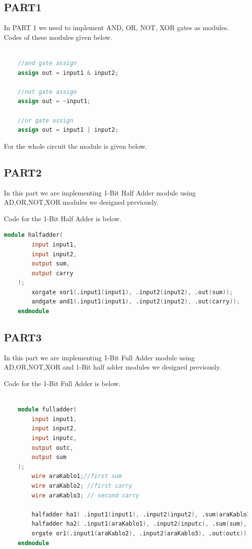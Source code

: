 \documentclass[pdftex,12pt,a4paper]{article}
\begin{document}
\subsection{PART1}

In PART 1 we need to implement AND, OR, NOT, XOR gates as modules. Codes of these modules given below.

\begin{lstlisting}[language = Verilog]

    //and gate assign
    assign out = input1 & input2; 
    
    //not gate assign
    assign out = ~input1;

    //or gate assign
    assign out = input1 | input2;


\end{lstlisting}
For the whole circuit the module is given below.

\subsection{PART2}
In this part we are implementing 1-Bit Half Adder module using AD,OR,NOT,XOR modules we designed previously.

Code for the 1-Bit Half Adder is below.

\begin{lstlisting}[language = Verilog]
    module halfadder(
        input input1,
        input input2,
        output sum,
        output carry
    );
        xorgate xor1(.input1(input1), .input2(input2), .out(sum));
        andgate and1(.input1(input1), .input2(input2), .out(carry));
    endmodule
\end{lstlisting}


\subsection{PART3}
In this part we are implementing 1-Bit Full Adder module using AD,OR,NOT,XOR and 1-Bit half adder modules we designed previously.

Code for the 1-Bit Full Adder is below.

\begin{lstlisting}[language = Verilog]

    module fulladder(
        input input1,
        input input2,
        input inputc,
        output outc,
        output sum
    );
        wire araKablo1;//first sum
        wire araKablo2; //first carry
        wire araKablo3; // second carry
    
        halfadder ha1( .input1(input1), .input2(input2), .sum(araKablo1), .carry(araKablo2));
        halfadder ha2( .input1(araKablo1), .input2(inputc), .sum(sum), .carry(araKablo3));
        orgate or1(.input1(araKablo2), .input2(araKablo3), .out(outc));
    endmodule
\end{lstlisting}
\end{document}

